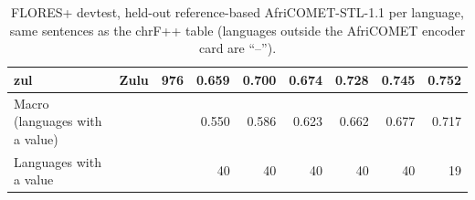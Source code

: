 \begin{table}[t]
\begin{tabular}{@{}llrrrrrrr@{}}
zul & Zulu & 976 & 0.659 & 0.700 & 0.674 & 0.728 & 0.745 & \textbf{0.752} \\
\midrule
Macro (languages with a value) & & & 0.550 & 0.586 & 0.623 & 0.662 & 0.677 & 0.717 \\
Languages with a value & & & 40 & 40 & 40 & 40 & 40 & 19 \\
\bottomrule
\end{tabular}
\caption{FLORES+ devtest, held-out reference-based AfriCOMET-STL-1.1 per language, same sentences as the chrF++ table (languages outside the AfriCOMET encoder card are ``--'').}
\label{tab:full-flores-comet}
\end{table}
